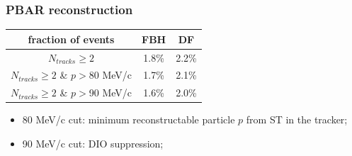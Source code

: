 \documentclass{beamer}
\begin{document}
\begin{frame}
    \frametitle{PBAR reconstruction}
    \begin{table}[h!]
        \centering
        \hspace*{-0.5em}
        \renewcommand{\arraystretch}{1.}
           \begin{tabular}{| c | c | c |} 
            \hline
            {\scriptsize fraction of events} &  {\scriptsize FBH } &  {\scriptsize DF}\\
            \hline
              {\scriptsize $N_{tracks} \geq 2$} &   {\scriptsize 1.8\%} &  {\scriptsize 2.2\%}\\
            \hline
             {\scriptsize $N_{tracks} \geq 2$ \& $p>$80 MeV/c} &  {\scriptsize 1.7\%} &  {\scriptsize 2.1\%}\\
            \hline
             {\scriptsize $N_{tracks} \geq 2$ \& $p>$90 MeV/c } &  {\scriptsize 1.6\%} &  {\scriptsize 2.0\%}\\
            \hline
            \end{tabular}
        \label{tab:0bbpbar}
        \end{table}
        \begin{itemize}
        \item 80 MeV/c cut: minimum reconstructable particle $p$ from ST in the tracker;
 \item 90 MeV/c cut: DIO suppression;
        \end{itemize}
\end{frame}
\end{document}
